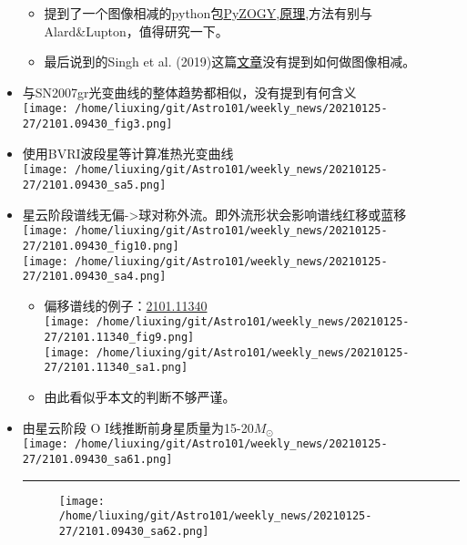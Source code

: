 \documentclass[
]{article}
\begin{document}
\begin{itemize}
  \begin{itemize}
  \item
    提到了一个图像相减的python包\href{https://github.com/dguevel/PyZOGY}{PyZOGY},\href{Zackay_image-sub.pdf}{原理},方法有别与Alard\&Lupton，值得研究一下。
  \item
    最后说到的Singh et al.
    (2019)这篇\href{Singh_2019.pdf}{文章}没有提到如何做图像相减。
  \end{itemize}
\item
  与SN2007gr光变曲线的整体趋势都相似，没有提到有何含义\\
  \texttt{[image: /home/liuxing/git/Astro101/weekly\_news/20210125-27/2101.09430\_fig3.png]}
\item
  使用BVRI波段星等计算准热光变曲线\\
  \texttt{[image: /home/liuxing/git/Astro101/weekly\_news/20210125-27/2101.09430\_sa5.png]}
\item
  星云阶段谱线无偏-\textgreater 球对称外流。即外流形状会影响谱线红移或蓝移\\
  \texttt{[image: /home/liuxing/git/Astro101/weekly\_news/20210125-27/2101.09430\_fig10.png]}\\
  \texttt{[image: /home/liuxing/git/Astro101/weekly\_news/20210125-27/2101.09430\_sa4.png]}

  \begin{itemize}
  \item
    偏移谱线的例子：\href{2101.11340.pdf}{2101.11340}\\
    \texttt{[image: /home/liuxing/git/Astro101/weekly\_news/20210125-27/2101.11340\_fig9.png]}\\
    \texttt{[image: /home/liuxing/git/Astro101/weekly\_news/20210125-27/2101.11340\_sa1.png]}
  \item
    由此看似乎本文的判断不够严谨。
  \end{itemize}
\item
  由星云阶段 O I线推断前身星质量为15-20\(M_⊙\)\\
  \texttt{[image: /home/liuxing/git/Astro101/weekly\_news/20210125-27/2101.09430\_sa61.png]}

  \begin{center}\rule{0.5\linewidth}{0.5pt}\end{center}

  \begin{figure}
  \centering
  \texttt{[image: /home/liuxing/git/Astro101/weekly\_news/20210125-27/2101.09430\_sa62.png]}
  \caption{}
  \end{figure}


\end{itemize}
\end{document}
